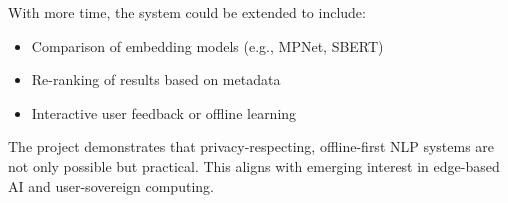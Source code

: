 With more time, the system could be extended to include:

\begin{itemize}
    \item Comparison of embedding models (e.g., MPNet, SBERT)
    \item Re-ranking of results based on metadata
    \item Interactive user feedback or offline learning
\end{itemize}

The project demonstrates that privacy-respecting, offline-first NLP systems are not only possible but practical. This aligns with emerging interest in edge-based AI and user-sovereign computing.
